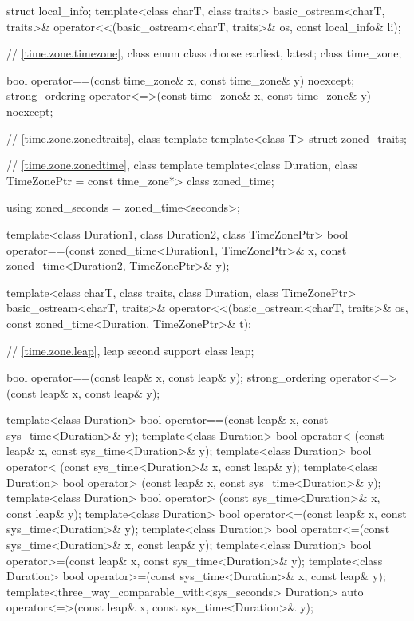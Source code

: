 \begin{codeblock}
{{    struct local_info;
    template<class charT, class traits>
      basic_ostream<charT, traits>&
        operator<<(basic_ostream<charT, traits>& os, const local_info& li);

    // \ref{time.zone.timezone}, class 
    enum class choose {earliest, latest};
    class time_zone;

    bool operator==(const time_zone& x, const time_zone& y) noexcept;
    strong_ordering operator<=>(const time_zone& x, const time_zone& y) noexcept;

    // \ref{time.zone.zonedtraits}, class template 
    template<class T> struct zoned_traits;

    // \ref{time.zone.zonedtime}, class template 
    template<class Duration, class TimeZonePtr = const time_zone*> class zoned_time;

    using zoned_seconds = zoned_time<seconds>;

    template<class Duration1, class Duration2, class TimeZonePtr>
      bool operator==(const zoned_time<Duration1, TimeZonePtr>& x,
                      const zoned_time<Duration2, TimeZonePtr>& y);

    template<class charT, class traits, class Duration, class TimeZonePtr>
      basic_ostream<charT, traits>&
        operator<<(basic_ostream<charT, traits>& os,
                   const zoned_time<Duration, TimeZonePtr>& t);

    // \ref{time.zone.leap}, leap second support
    class leap;

    bool operator==(const leap& x, const leap& y);
    strong_ordering operator<=>(const leap& x, const leap& y);

    template<class Duration>
      bool operator==(const leap& x, const sys_time<Duration>& y);
    template<class Duration>
      bool operator< (const leap& x, const sys_time<Duration>& y);
    template<class Duration>
      bool operator< (const sys_time<Duration>& x, const leap& y);
    template<class Duration>
      bool operator> (const leap& x, const sys_time<Duration>& y);
    template<class Duration>
      bool operator> (const sys_time<Duration>& x, const leap& y);
    template<class Duration>
      bool operator<=(const leap& x, const sys_time<Duration>& y);
    template<class Duration>
      bool operator<=(const sys_time<Duration>& x, const leap& y);
    template<class Duration>
      bool operator>=(const leap& x, const sys_time<Duration>& y);
    template<class Duration>
      bool operator>=(const sys_time<Duration>& x, const leap& y);
    template<three_way_comparable_with<sys_seconds> Duration>
      auto operator<=>(const leap& x, const sys_time<Duration>& y);

}}
\end{codeblock}
